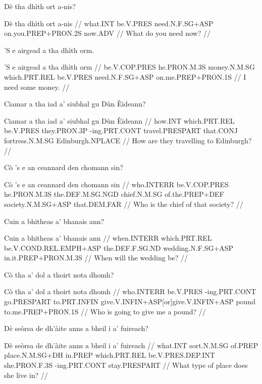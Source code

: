 \documentclass[a4paper,10pt]{article}
\begin{document}
\ex
\begingl
\glpre Dè tha dhìth ort a-nis? 

\vspace{4mm}
\gla Dè tha dhìth ort a-nis  //
\glb what.INT be.V.PRES need.N.F.SG+ASP on.you.PREP+PRON.2S now.ADV  //
\glft What do you need now? //
\endgl
\xe

\ex
\begingl
\glpre 'S e airgead a tha dhìth orm. 

\vspace{4mm}
\gla 'S e airgead a tha dhìth orm  //
\glb be.V.COP.PRES he.PRON.M.3S money.N.M.SG which.PRT.REL be.V.PRES need.N.F.SG+ASP on.me.PREP+PRON.1S  //
\glft I need some money. //
\endgl
\xe

\ex
\begingl
\glpre Ciamar a tha iad a' siubhal gu Dùn Èideann? 

\vspace{4mm}
\gla Ciamar a tha iad a' siubhal gu Dùn Èideann  //
\glb how.INT which.PRT.REL be.V.PRES they.PRON.3P -ing.PRT.CONT travel.PRESPART that.CONJ fortress.N.M.SG Edinburgh.NPLACE  //
\glft How are they travelling to Edinburgh? //
\endgl
\xe

\ex
\begingl
\glpre Cò 's e an ceannard den chomann sin? 

\vspace{4mm}
\gla Cò 's e an ceannard den chomann sin  //
\glb who.INTERR be.V.COP.PRES he.PRON.M.3S the.DEF.M.SG.NGD chief.N.M.SG of.the.PREP+DEF society.N.M.SG+ASP that.DEM.FAR  //
\glft Who is the chief of that society? //
\endgl
\xe

\ex
\begingl
\glpre Cuin a bhitheas a' bhanais ann? 

\vspace{4mm}
\gla Cuin a bhitheas a' bhanais ann  //
\glb when.INTERR which.PRT.REL be.V.COND.REL.EMPH+ASP the.DEF.F.SG.ND wedding.N.F.SG+ASP in.it.PREP+PRON.M.3S  //
\glft When will the wedding be? //
\endgl
\xe

\ex
\begingl
\glpre Cò tha a' dol a thoirt nota dhomh? 

\vspace{4mm}
\gla Cò tha a' dol a thoirt nota dhomh  //
\glb who.INTERR be.V.PRES -ing.PRT.CONT go.PRESPART to.PRT.INFIN give.V.INFIN+ASP[or]give.V.INFIN+ASP pound to.me.PREP+PRON.1S  //
\glft Who is going to give me a pound? //
\endgl
\xe

\ex
\begingl
\glpre Dè seòrsa de dh'àite anns a bheil i a' fuireach? 

\vspace{4mm}
\gla Dè seòrsa de dh'àite anns a bheil i a' fuireach  //
\glb what.INT sort.N.M.SG of.PREP place.N.M.SG+DH in.PREP which.PRT.REL be.V.PRES.DEP.INT she.PRON.F.3S -ing.PRT.CONT stay.PRESPART  //
\glft What type of place does she live in? //
\endgl
\xe
\end{document}
